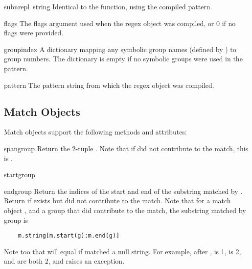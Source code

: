 \begin{funcdesc}{subn}{repl\, string}
Identical to the  function, using the compiled pattern.
\end{funcdesc}

\renewcommand{\indexsubitem}{(regex attribute)}

\begin{datadesc}{flags}
The flags argument used when the regex object was compiled, or 0 if no
flags were provided.
\end{datadesc}

\begin{datadesc}{groupindex}
A dictionary mapping any symbolic group names (defined by 
) to group numbers.  The dictionary is empty if no
symbolic groups were used in the pattern.
\end{datadesc}

\begin{datadesc}{pattern}
The pattern string from which the regex object was compiled.
\end{datadesc}

\subsection{Match Objects}
Match objects support the following methods and attributes:

\begin{funcdesc}{span}{group}
Return the 2-tuple .
Note that if  did not contribute to the match, this is .
\end{funcdesc}

\begin{funcdesc}{start}{group}
\end{funcdesc}

\begin{funcdesc}{end}{group}
Return the indices of the start and end of the substring matched by
.  Return  if  exists but did not contribute to
the match.  Note that for a match object , and a group 
that did contribute to the match, the substring matched by group  is
\bcode\begin{verbatim}
    m.string[m.start(g):m.end(g)]
\end{verbatim}\ecode
%
Note too that  will equal
 if  matched a null string.  For example,
after ,  is 1,
 is 2,  and  are both
2, and  raises an 
 exception.
\end{funcdesc}

